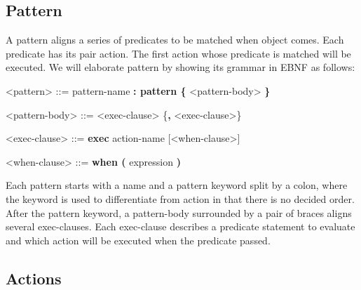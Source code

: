 \subsection {Pattern}
A pattern aligns a series of predicates to be matched when object comes. Each predicate has its pair action. The first action whose predicate is matched will be executed. We will elaborate pattern by showing its grammar in EBNF as follows:

\begin{center}
  \begin{minipage}{0.8\linewidth}
    \begin{grammar}
      <pattern> ::= pattern-name \textbf{: pattern \{} <pattern-body> \textbf{\}}

      <pattern-body> ::= <exec-clause> \{\textbf{,} <exec-clause>\}

      <exec-clause> ::= \textbf{exec} action-name [<when-clause>]

      <when-clause> ::= \textbf{when (} expression \textbf{)}
    \end{grammar}
  \end{minipage}
\end{center}

Each pattern starts with a name and a pattern keyword split by a colon, where the keyword is used to differentiate from action in that there is no decided order. After the pattern keyword, a pattern-body surrounded by a pair of braces aligns several exec-clauses. Each exec-clause describes a predicate statement to evaluate and which action will be executed when the predicate passed. 

\subsection {Actions}

